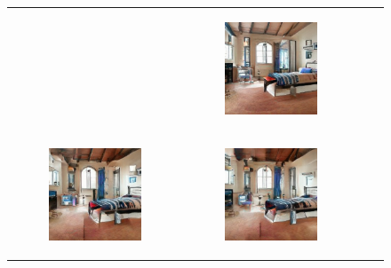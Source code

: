 \documentclass{article}
\begin{document}
\begin{figure}[H]
\begin{tabular}{c c c c}
\begin{subfigure}[h!]{0.25\textwidth}
    \end{subfigure} &
     \begin{subfigure}[h!]{0.25\textwidth}
        \includegraphics[scale=0.35]{images/n4.png}
    \end{subfigure}\\
     \begin{subfigure}[h!]{0.25\textwidth}
        \includegraphics[scale=0.35]{images/a1.png}
    \end{subfigure} &
     \begin{subfigure}[h!]{0.25\textwidth}
        \includegraphics[scale=0.35]{images/a2.png}

\end{subfigure}
\end{tabular}
\end{figure}
\end{document}
